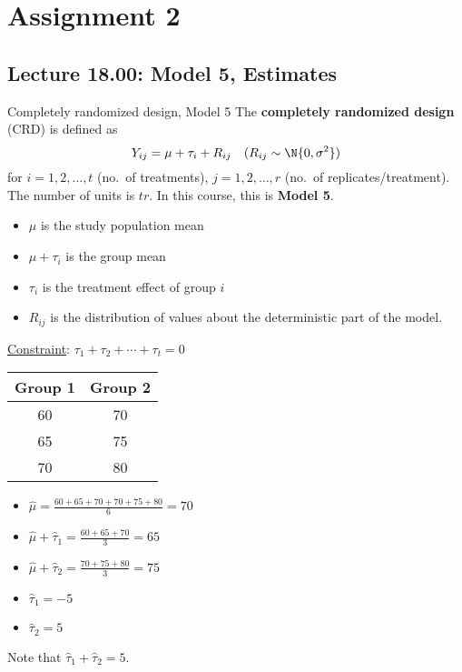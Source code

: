 \chapter{Assignment 2}
\section{Lecture 18.00: Model 5, Estimates}
\begin{Definition}{Completely randomized design, Model 5}{}
    The \textbf{completely randomized design} (CRD) is defined as
    \[ Y_{ij}=\mu+\tau_i+R_{ij}\quad(R_{ij}\sim \N{0,\sigma^2}) \]
    for $ i=1,2,\ldots,t $ (no.\ of treatments),
    $ j=1,2,\ldots,r $ (no.\ of replicates/treatment).
    The number of units is $ tr $. In this course,
    this is \textbf{Model 5}.
    \begin{itemize}
        \item $ \mu $ is the study population mean
        \item $ \mu+\tau_i $ is the group mean
        \item $ \tau_i $ is the treatment effect of group $ i $
        \item $ R_{ij} $ is the distribution of values about the deterministic
              part of the model.
    \end{itemize}
    \underline{Constraint}: $ \tau_1+\tau_2+\cdots+\tau_t=0 $
\end{Definition}
\begin{Example}{}{}
    \begin{center}
        \begin{NiceTabular}{cc}
            Group 1 & Group 2 \\
                  & 70      \\
            65      & 75      \\
            70      & 80      \\
        \end{NiceTabular}
    \end{center}
    \begin{itemize}
        \item $ \hat{\mu}=\frac{60+65+70+70+75+80}{6} =70 $
        \item $ \hat{\mu}+\hat{\tau}_1=\frac{60+65+70}{3}=65 $
        \item $ \hat{\mu}+\hat{\tau}_2=\frac{70+75+80}{3}=75 $
        \item $ \hat{\tau}_1=-5 $
        \item $ \hat{\tau}_2=5 $
    \end{itemize}
    Note that $ \hat{\tau}_1+\hat{\tau}_2=5 $.
\end{Example}
